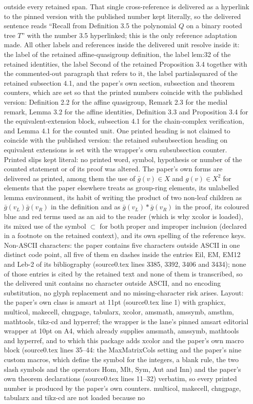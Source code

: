 \documentclass[10pt,a4paper]{amsart}
\theoremstyle{definition}
\begin{document}
outside every retained span. That single cross-reference is delivered as a hyperlink to the pinned version with the published number kept literally, so the delivered sentence reads ``Recall from Definition 3.5 the polynomial $Q$ on a binary rooted tree $T$'' with the number 3.5 hyperlinked; this is the only reference adaptation made. All other labels and references inside the delivered unit resolve inside it: the label of the retained affine-quasigroup definition, the label lem:32 of the retained identities, the label Second of the retained Proposition 3.4 together with the commented-out paragraph that refers to it, the label partialsquared of the retained subsection 4.1, and the paper's own section, subsection and theorem counters, which are set so that the printed numbers coincide with the published version: Definition 2.2 for the affine quasigroup, Remark 2.3 for the medial remark, Lemma 3.2 for the affine identities, Definition 3.3 and Proposition 3.4 for the equivalent-extension block, subsection 4.1 for the chain-complex verification, and Lemma 4.1 for the counted unit. One printed heading is not claimed to coincide with the published version: the retained subsubsection heading on equivalent extensions is set with the wrapper's own subsubsection counter. Printed slips kept literal: no printed word, symbol, hypothesis or number of the counted statement or of its proof was altered. The paper's own forms are delivered as printed, among them the use of $\bar g(v)\in X$ and $g(v)\in X^2$ for elements that the paper elsewhere treats as group-ring elements, its unlabelled lemma environment, its habit of writing the product of two non-leaf children as $\bar g(v_L)\bar g(v_R)$ in the definition and as $\bar g(v_L)*\bar g(v_R)$ in the proof, its coloured blue and red terms used as an aid to the reader (which is why xcolor is loaded), its mixed use of the symbol $\subset$ for both proper and improper inclusion (declared in a footnote on the retained context), and its own spelling of the reference keys. Non-ASCII characters: the paper contains five characters outside ASCII in one distinct code point, all five of them en dashes inside the entries Eil, EM, EM12 and Leb-2 of its bibliography (source0.tex lines 3385, 3392, 3406 and 3434); none of those entries is cited by the retained text and none of them is transcribed, so the delivered unit contains no character outside ASCII, and no encoding substitution, no glyph replacement and no missing-character risk arises. Layout: the paper's own class is amsart at 11pt (source0.tex line 1) with graphicx, multicol, makecell, chngpage, tabularx, xcolor, amsmath, amssymb, amsthm, mathtools, tikz-cd and hyperref; the wrapper is the lane's pinned amsart editorial wrapper at 10pt on A4, which already supplies amsmath, amssymb, mathtools and hyperref, and to which this package adds xcolor and the paper's own macro block (source0.tex lines 35--44: the MaxMatrixCols setting and the paper's nine custom macros, which define the symbol for the integers, a blank rule, the two slash symbols and the operators Hom, Mlt, Sym, Aut and Inn) and the paper's own theorem declarations (source0.tex lines 11--32) verbatim, so every printed number is produced by the paper's own counters. multicol, makecell, chngpage, tabularx and tikz-cd are not loaded because no 
\end{document}
